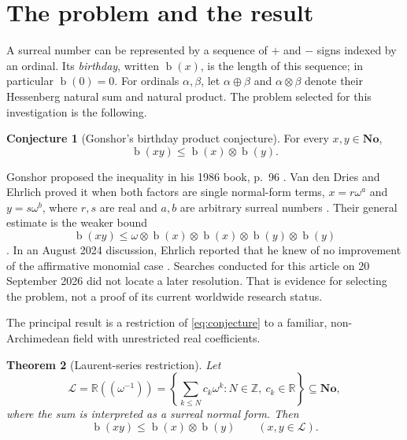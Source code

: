\documentclass[11pt,letterpaper]{article}
\numberwithin{equation}{section}
\newtheorem{theorem}{Theorem}[section]
\theoremstyle{definition}
\newtheorem{conjecture}[theorem]{Conjecture}
\theoremstyle{remark}
\newcommand{\No}{\mathbf{No}}
\newcommand{\R}{\mathbb{R}}
\newcommand{\Z}{\mathbb{Z}}
\newcommand{\Lau}{\mathcal{L}}
\newcommand{\bd}{\operatorname{b}}
\newcommand{\ns}{\mathbin{\oplus}}
\newcommand{\np}{\mathbin{\otimes}}
\begin{document}
\newpage
\tableofcontents
\vspace{1.2em}

\section{The problem and the result}
\label{sec:problem}
A surreal number can be represented by a sequence of $+$ and $-$ signs indexed
by an ordinal. Its \emph{birthday}, written $\bd(x)$, is the length of this
sequence; in particular $\bd(0)=0$. For ordinals $\alpha,\beta$, let
$\alpha\ns\beta$ and $\alpha\np\beta$ denote their Hessenberg natural sum and
natural product. The problem selected for this investigation is the following.

\begin{conjecture}[Gonshor's birthday product conjecture]
\label{conj:gonshor}
For every $x,y\in\No$,
\begin{equation}\label{eq:conjecture}
 \bd(xy)\leq \bd(x)\np\bd(y).
\end{equation}
\end{conjecture}

Gonshor proposed the inequality in his 1986 book, p.~96
\cite{Gonshor1986}. Van den Dries and Ehrlich proved it when both factors are
single normal-form terms, $x=r\omega^a$ and $y=s\omega^b$, where $r,s$ are real
and $a,b$ are arbitrary surreal numbers \cite[Proposition~3.6]{vdDE2001}.
Their general estimate is the weaker bound
\begin{equation}\label{eq:knownweak}
 \bd(xy)\leq
 \omega\np\bd(x)\np\bd(x)\np\bd(y)\np\bd(y)
\end{equation}
\cite[Corollary~4.3]{vdDE2001}. In an August 2024 discussion, Ehrlich reported
that he knew of no improvement of the affirmative monomial case
\cite{Ehrlich2024}. Searches conducted for this article on 20 September 2026
did not locate a later resolution. That is evidence for selecting the problem,
not a proof of its current worldwide research status.

The principal result is a restriction of \eqref{eq:conjecture} to a familiar,
non-Archimedean field with unrestricted real coefficients.

\begin{theorem}[Laurent-series restriction]\label{thm:main}
Let
\begin{equation}\label{eq:field}
 \Lau=\R((\omega^{-1}))
 =\left\{\sum_{k\leq N}c_k\omega^k:
     N\in\Z,\ c_k\in\R\right\}\subseteq\No,
\end{equation}
where the sum is interpreted as a surreal normal form. Then
\[
 \bd(xy)\leq\bd(x)\np\bd(y)\qquad(x,y\in\Lau).
\]
\end{theorem}
\end{document}
